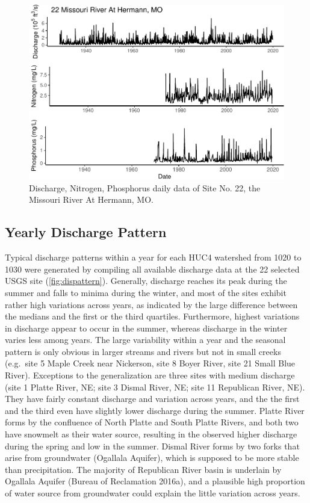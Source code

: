\documentclass[12pt,]{article}
\makeatletter
\def\maxwidth{\ifdim\Gin@nat@width>\linewidth\linewidth\else\Gin@nat@width\fi}
\makeatother
\begin{document}
\begin{figure}[H]
\includegraphics[width=\maxwidth]{Missouri-Reasearch-Project---FINAL_files/figure-latex/dataexample-1} \caption{\label{fig:dataexample} Discharge, Nitrogen, Phosphorus daily data of Site No. 22, the  Missouri River At Hermann, MO.}\label{fig:dataexample}
\end{figure}

\hypertarget{yearly-discharge-pattern}{%
\subsection{Yearly Discharge Pattern}\label{yearly-discharge-pattern}}

Typical discharge patterns within a year for each HUC4 watershed from
1020 to 1030 were generated by compiling all available discharge data at
the 22 selected USGS site (\autoref{fig:dispattern}). Generally,
discharge reaches its peak during the summer and falls to minima during
the winter, and most of the sites exhibit rather high variations across
years, as indicated by the large difference between the medians and the
first or the third quartiles. Furthermore, highest variations in
discharge appear to occur in the summer, whereas discharge in the winter
varies less among years. The large variability within a year and the
seasonal pattern is only obvious in larger streams and rivers but not in
small creeks (e.g.~site 5 Maple Creek near Nickerson, site 8 Boyer
River, site 21 Small Blue River). Exceptions to the generalization are
three sites with medium discharge (site 1 Platte River, NE; site 3
Dismal River, NE; site 11 Republican River, NE). They have fairly
constant discharge and variation across years, and the the first and the
third even have slightly lower discharge during the summer. Platte River
forms by the confluence of North Platte and South Platte Rivers, and
both two have snowmelt as their water source, resulting in the observed
higher discharge during the spring and low in the summer. Dismal River
forms by two forks that arise from groundwater (Ogallala Aquifer), which
is supposed to be more stable than precipitation. The majority of
Republican River basin is underlain by Ogallala Aquifer (Bureau of
Reclamation 2016a), and a plausible high proportion of water source from
groundwater could explain the little variation across years.
\end{document}
